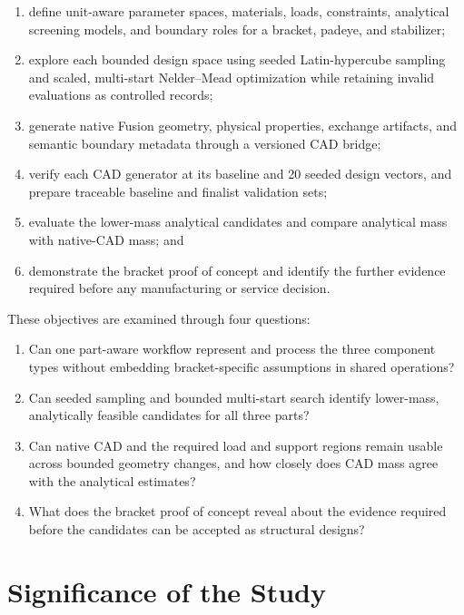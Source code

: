 \begin{enumerate}
    \item define unit-aware parameter spaces, materials, loads, constraints,
    analytical screening models, and boundary roles for a bracket, padeye, and
    stabilizer;
    \item explore each bounded design space using seeded Latin-hypercube
    sampling and scaled, multi-start Nelder--Mead optimization while retaining
    invalid evaluations as controlled records;
    \item generate native Fusion geometry, physical properties, exchange
    artifacts, and semantic boundary metadata through a versioned CAD bridge;
    \item verify each CAD generator at its baseline and 20 seeded design
    vectors, and prepare traceable baseline and finalist validation sets;
    \item evaluate the lower-mass analytical candidates and compare analytical
    mass with native-CAD mass; and
    \item demonstrate the bracket proof of concept and identify the further
    evidence required before any manufacturing or service decision.
\end{enumerate}

These objectives are examined through four questions:

\begin{enumerate}
    \item Can one part-aware workflow represent and process the three component
    types without embedding bracket-specific assumptions in shared operations?
    \item Can seeded sampling and bounded multi-start search identify
    lower-mass, analytically feasible candidates for all three parts?
    \item Can native CAD and the required load and support regions remain
    usable across bounded geometry changes, and how closely does CAD mass
    agree with the analytical estimates?
    \item What does the bracket proof of concept reveal about the evidence
    required before the candidates can be accepted as structural designs?
\end{enumerate}

\section{Significance of the Study}
\label{sec:significance}

